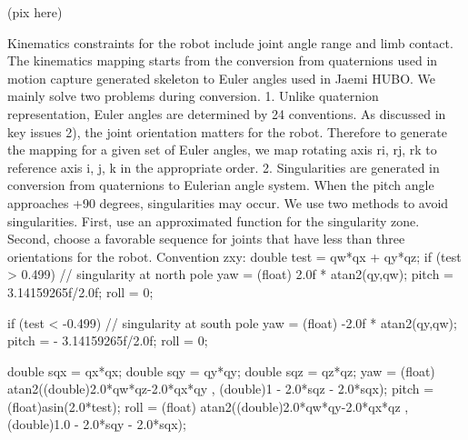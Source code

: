 (pix here)

Kinematics constraints for the robot include joint angle range and limb contact. 
The kinematics mapping starts from the conversion from quaternions used in motion capture generated skeleton to Euler angles used in Jaemi HUBO. We mainly solve two problems during conversion.
1.	Unlike quaternion representation, Euler angles are determined by 24 conventions. As discussed in key issues 2), the joint orientation matters for the robot. Therefore to generate the mapping for a given set of Euler angles, we map rotating axis ri, rj, rk to reference axis i, j, k in the appropriate order. 
2.	Singularities are generated in conversion from quaternions to Eulerian angle system. When the pitch angle approaches +90 degrees, singularities may occur. We use two methods to avoid singularities. First, use an approximated function for the singularity zone. Second, choose a favorable sequence for joints that have less than three orientations for the robot.
Convention zxy: 
double test = qw*qx + qy*qz;
if (test > 0.499) // singularity at north pole
		yaw = (float) 2.0f * atan2(qy,qw);
		pitch = 3.14159265f/2.0f;
		roll = 0;
		
if (test < -0.499) // singularity at south pole
		yaw = (float) -2.0f * atan2(qy,qw);
		pitch = - 3.14159265f/2.0f;
		roll = 0;
        
	
    double sqx = qx*qx;
    double sqy = qy*qy;
    double sqz = qz*qz;
yaw = (float) atan2((double)2.0*qw*qz-2.0*qx*qy , (double)1 - 2.0*sqz - 2.0*sqx);
pitch = (float)asin(2.0*test);
roll = (float) atan2((double)2.0*qw*qy-2.0*qx*qz , (double)1.0 - 2.0*sqy - 2.0*sqx);
